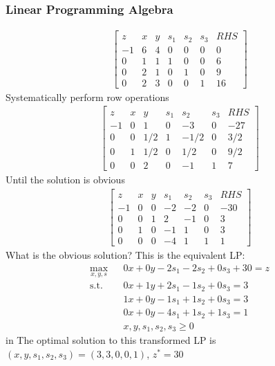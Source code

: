 \documentclass[12pt,handout]{beamer}
\begin{document}
\begin{frame}
\frametitle{Linear Programming Algebra}
\tiny
\begin{eqnarray}
\left[ \begin{array}{rrrrrr|r}
z & x & y & s_1 & s_2 & s_3 & RHS \\
-1 & 6 & 4 & 0 & 0 & 0 & 0 \\
0 & 1 & 1 & 1 & 0 & 0 & 6 \\
0 & 2 & 1 & 0 & 1 & 0 & 9 \\
0 & 2 & 3 & 0 & 0 & 1 & 16
\end{array} \right] \nonumber
\end{eqnarray}
Systematically perform row operations
\begin{eqnarray}
\left[ \begin{array}{rrrrrr|r}
z & x & y & s_1 & s_2 & s_3 & RHS \\
-1 & 0 & 1 & 0 & -3 & 0 & -27 \\
0 & 0 & 1/2 & 1 & -1/2 & 0 & 3/2 \\
0 & 1 & 1/2 & 0 & 1/2 & 0 & 9/2 \\
0 & 0 & 2 & 0 & -1 & 1 & 7
\end{array} \right] \nonumber
\end{eqnarray}
Until the solution is obvious
\begin{eqnarray}
\left[ \begin{array}{rrrrrr|r}
z & x & y & s_1 & s_2 & s_3 & RHS \\
-1 & 0 & 0 & -2 & -2 & 0 & -30 \\
0 & 0 & 1 & 2 & -1 & 0 & 3 \\
0 & 1 & 0 & -1 & 1 & 0 & 3 \\
0 & 0 & 0 & -4 & 1 & 1 & 1
\end{array} \right] \nonumber
\end{eqnarray}
What is the obvious solution? This is the equivalent LP:
\begin{eqnarray}
\max_{x, y, s} && 0 x + 0 y - 2 s_1 - 2 s_2 + 0 s_3 + 30 = z\nonumber \\
\mbox{s.t.} && 0x + 1y + 2 s_1 - 1s_2 + 0 s_3 = 3 \nonumber \\
&& 1x + 0y - 1s_1 + 1s_2 + 0 s_3 = 3 \nonumber \\
&& 0x + 0y - 4s_1 + 1s_2 + 1s_3 = 1 \nonumber \\
&& x,y,s_1,s_2,s_3 \ge 0 \nonumber
\end{eqnarray}
 in
The optimal solution to this transformed LP is $(x, y, s_1, s_2, s_3) = (3, 3, 0, 0, 1)$, $z^* = 30$
\end{frame}
\end{document}
